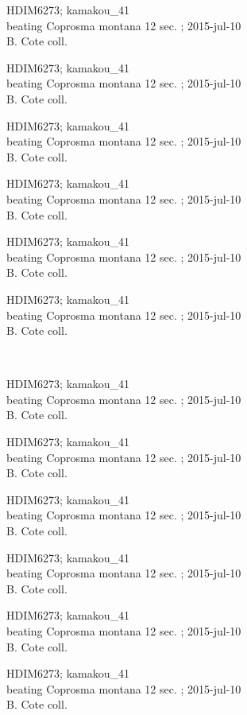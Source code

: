 \documentclass[2pt]{extarticle}
\begin{document}
\noindent
\parbox{0.16\textwidth}{\tiny \raggedright \rule[-0.3\baselineskip]{0pt}{10pt}HDIM6273; kamakou\_41\\ beating Coprosma montana 12 sec. ; 2015-jul-10\\ B. Cote coll.}
\parbox{0.16\textwidth}{\tiny \raggedright \rule[-0.3\baselineskip]{0pt}{10pt}HDIM6273; kamakou\_41\\ beating Coprosma montana 12 sec. ; 2015-jul-10\\ B. Cote coll.}
\parbox{0.16\textwidth}{\tiny \raggedright \rule[-0.3\baselineskip]{0pt}{10pt}HDIM6273; kamakou\_41\\ beating Coprosma montana 12 sec. ; 2015-jul-10\\ B. Cote coll.}
\parbox{0.16\textwidth}{\tiny \raggedright \rule[-0.3\baselineskip]{0pt}{10pt}HDIM6273; kamakou\_41\\ beating Coprosma montana 12 sec. ; 2015-jul-10\\ B. Cote coll.}
\parbox{0.16\textwidth}{\tiny \raggedright \rule[-0.3\baselineskip]{0pt}{10pt}HDIM6273; kamakou\_41\\ beating Coprosma montana 12 sec. ; 2015-jul-10\\ B. Cote coll.}
\parbox{0.16\textwidth}{\tiny \raggedright \rule[-0.3\baselineskip]{0pt}{10pt}HDIM6273; kamakou\_41\\ beating Coprosma montana 12 sec. ; 2015-jul-10\\ B. Cote coll.} \\ 
\vspace{0.001in} 

\noindent
\parbox{0.16\textwidth}{\tiny \raggedright \rule[-0.3\baselineskip]{0pt}{10pt}HDIM6273; kamakou\_41\\ beating Coprosma montana 12 sec. ; 2015-jul-10\\ B. Cote coll.}
\parbox{0.16\textwidth}{\tiny \raggedright \rule[-0.3\baselineskip]{0pt}{10pt}HDIM6273; kamakou\_41\\ beating Coprosma montana 12 sec. ; 2015-jul-10\\ B. Cote coll.}
\parbox{0.16\textwidth}{\tiny \raggedright \rule[-0.3\baselineskip]{0pt}{10pt}HDIM6273; kamakou\_41\\ beating Coprosma montana 12 sec. ; 2015-jul-10\\ B. Cote coll.}
\parbox{0.16\textwidth}{\tiny \raggedright \rule[-0.3\baselineskip]{0pt}{10pt}HDIM6273; kamakou\_41\\ beating Coprosma montana 12 sec. ; 2015-jul-10\\ B. Cote coll.}
\parbox{0.16\textwidth}{\tiny \raggedright \rule[-0.3\baselineskip]{0pt}{10pt}HDIM6273; kamakou\_41\\ beating Coprosma montana 12 sec. ; 2015-jul-10\\ B. Cote coll.}
\parbox{0.16\textwidth}{\tiny \raggedright \rule[-0.3\baselineskip]{0pt}{10pt}HDIM6273; kamakou\_41\\ beating Coprosma montana 12 sec. ; 2015-jul-10\\ B. Cote coll.} \\ 
\vspace{0.001in} 
\end{document}
